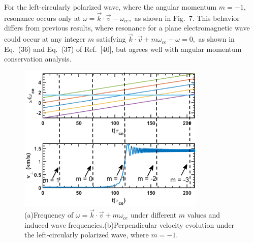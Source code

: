 \documentclass{cpbtex}
\begin{document}
\begin{CJK*}{GBK}{song}
For the left-circularly polarized wave, where the angular momentum \( m = -1 \), resonance occurs only at
\(
\omega = \vec{k} \cdot \vec{v} - \omega_{ce},
\)
as shown in Fig.~7. This behavior differs from previous results, where resonance for a plane electromagnetic wave could occur at any integer \( m \) satisfying
\(
\vec{k} \cdot \vec{v} + m\omega_{ce} - \omega = 0,
\)
as shown in Eq.~(36) and Eq.~(37) of Ref.~[40], but agrees well with angular momentum conservation analysis.

\begin{figure}[htbp]
\centering
\includegraphics[width=0.8\textwidth]{Figure7.eps}%
\caption{\label{fig:7}(a)Frequency of $\omega = \vec{k} \cdot \vec{v} + m\omega_{ce}$ under different $m$ values and induced wave frequencies.(b)Perpendicular velocity evolution under the left-circularly polarized wave, where $m = -1$.}
\end{figure}






\end{CJK*}
\end{document}
